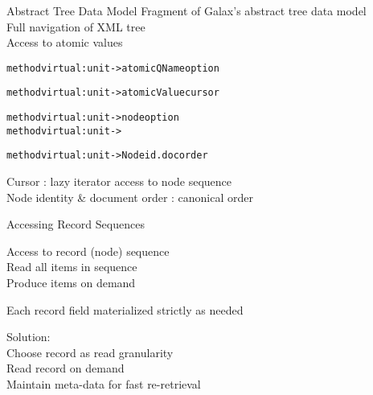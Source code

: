 \documentclass[landscape]{slides}
\begin{document}
\begin{Slide}{Abstract Tree Data Model}
\vspace*{1cm}
\bb Fragment of Galax's abstract tree data model\\
\bbb Full navigation of XML tree\\
\bbb Access to atomic values

{\small
\begin{alltt}
  method virtual     : unit -> atomicQName option

  method virtual   : unit -> atomicValue cursor

  method virtual        : unit -> node option
  method virtual      : unit -> 

  method virtual   : unit -> Nodeid.docorder
\end{alltt}}

\bb Cursor : lazy iterator access to node sequence\\
\bb Node identity \& document order : canonical order 

\end{Slide}

\begin{Slide}{Accessing Record Sequences}

  \bb Access to record (node) sequence \\
  \bbb Read all items in sequence \\
  \bbb Produce items on demand

  \bb Each record field materialized strictly as needed

  \bb Solution: \\
  \bbb Choose record as read granularity \\
  \bbb Read record on demand \\
  \bbb Maintain meta-data for fast re-retrieval
\end{Slide}

\end{document}

